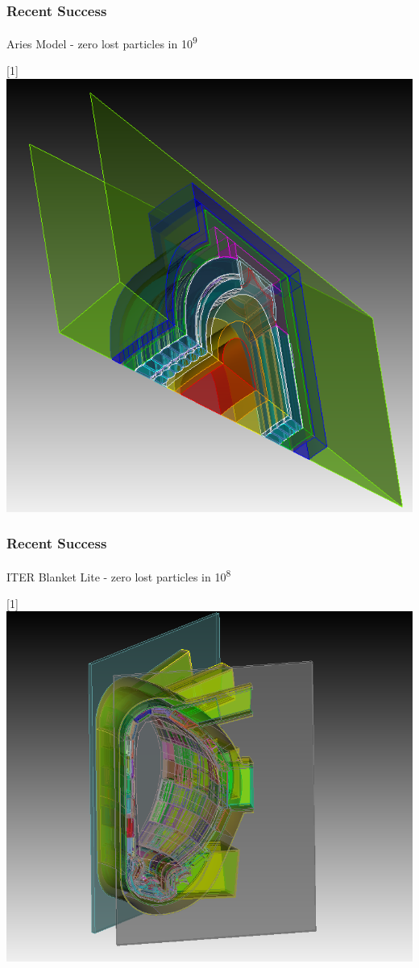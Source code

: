 \documentclass[14pt]{beamer}
\begin{document}
\begin{frame}
\frametitle{Recent Success}

Aries Model - zero lost particles in 10\textsuperscript{9}
\begin{center}
\scalebox{-1}[1]{\includegraphics[scale=0.3]{sic-bottom.png}}
\end{center}

\end{frame}

\begin{frame}
\frametitle{Recent Success}

ITER Blanket Lite
 - zero lost particles in 10\textsuperscript{8}
\begin{center}
\scalebox{-1}[1]{\includegraphics[scale=0.3]{blanketlitemodel.png}}
\end{center}

\end{frame}
\end{document}
